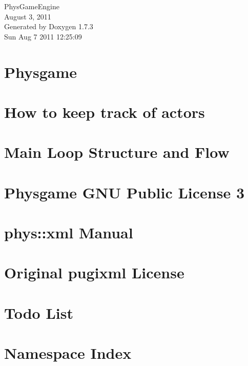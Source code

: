 \documentclass[a4paper]{article}
\begin{document}
\hypersetup{pageanchor=false}
\begin{titlepage}
\vspace*{7cm}
\begin{center}
{\Large PhysGameEngine \\[1ex]\large August 3, 2011 }\\
\vspace*{1cm}
{\large Generated by Doxygen 1.7.3}\\
\vspace*{0.5cm}
{\small Sun Aug 7 2011 12:25:09}\\
\end{center}
\end{titlepage}
\tableofcontents
{}
\hypersetup{pageanchor=true}
\section{Physgame}
\label{index}\hypertarget{index}{}
\section{How to keep track of actors}
\label{actorcontainer1}
\hypertarget{actorcontainer1}{}

\section{Main Loop Structure and Flow}
\label{mainloop1}
\hypertarget{mainloop1}{}

\section{Physgame GNU Public License 3}
\label{GPLLicense}
\hypertarget{GPLLicense}{}

\section{phys::xml Manual}
\label{XMLManual}
\hypertarget{XMLManual}{}

\section{Original pugixml License}
\label{OriginalpugixmlLicense}
\hypertarget{OriginalpugixmlLicense}{}

\section{Todo List}
\label{todo}
\hypertarget{todo}{}

\section{Namespace Index}

\end{document}
